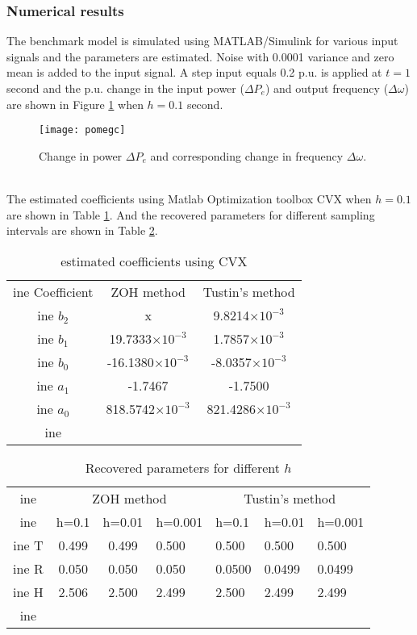 \documentclass[10pt,journal,final]{IEEEtran}
\begin{document}
\subsubsection{Numerical results}
The benchmark model is simulated using MATLAB/Simulink for various input signals and the parameters are estimated. Noise with 0.0001 variance and zero mean is added to the input signal. A step input equals 0.2 p.u. is applied at $t=1$ second and the p.u. change in the input power ($\Delta P_{e}$) and output {frequency} ($\Delta \omega$) are shown in Figure \ref{inout} when $h=0.1$ second.
\begin{figure}[h!]
\centering
\texttt{[image: pomegc]}
\caption{Change in power $\Delta P_{e}$ and corresponding change in frequency $\Delta \omega$.}
\label{inout}
\end{figure}\\
The estimated coefficients using Matlab Optimization toolbox CVX \cite{cvx} when $h=0.1$ are shown in Table \ref{tab:coeffi1}. And the recovered parameters for different sampling intervals are shown in Table \ref{tab:rec1}.
\begin{table}[h]
\caption {estimated coefficients using CVX} \label{tab:coeffi1}
\centering
\begin{tabular}{|c|c|c|}
ine
Coefficient & ZOH method         & Tustin's method    \\ ine
$b_{2}$          & x                  & 9.8214$\times 10^{-3}$  \\ ine
$b_{1}$          & 19.7333$\times 10^{-3}$  & 1.7857$\times 10^{-3}$  \\ ine
$b_{0}$         & -16.1380$\times 10^{-3}$ & -8.0357$\times 10^{-3}$  \\ ine
$a_{1}$         & -1.7467 & -1.7500 \\ ine
$a_{0}$          & 818.5742$\times 10^{-3}$  & 821.4286$\times 10^{-3}$  \\ ine
\end{tabular}
\end{table}
\begin{table}[h]
\caption {Recovered parameters for different $h$} \label{tab:rec1}
\centering
\begin{tabular}{|c|c|c|l|l|l|l|}
ine
  & \multicolumn{3}{c|}{ZOH method} & \multicolumn{3}{c|}{Tustin's method} \\ ine
  & h=0.1    & h=0.01   & h=0.001   & h=0.1      & h=0.01     & h=0.001    \\ ine
T & 0.499    & 0.499    & 0.500     & 0.500      & 0.500      & 0.500      \\ ine
R & 0.050    & 0.050    & 0.050     & {0.0500}      & {0.0499}      & {0.0499}      \\ ine
H & 2.506    & 2.500    & 2.499     & {2.500}     & {2.499}     & {2.499}     \\ ine
\end{tabular}
\end{table}
\end{document}
